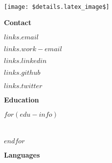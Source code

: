 \documentclass{article}
\begin{document}
    \begin{multicols}{2}
        \begin{tcolorbox}[width=75mm,height fill]
        \begin{center}
            \normalfont
            \pagecolor{maincontent}
            \vspace{12mm}
            {\huge {}}
            \vspace{10mm}\\
            \texttt{[image: \$details.latex\_image\$]} \\
        \end{center}
            \vspace{10mm}
            {\Large {\color{header}\textbf{Contact}}}
            
            \vspace{3mm}
            \textcolor{secondary}{$links.email$}
            \vspace{2mm}
            
            \textcolor{secondary}{$links.work-email$}
            \vspace{2mm}

            \textcolor{secondary}{\href{https://www.linkedin.com/in/$links.linkedin$}{$links.linkedin$}}
            \vspace{2mm}

            \textcolor{secondary}{\href{https://github.com/$links.github$}{$links.github$}}
            \vspace{2mm}

            \textcolor{secondary}{\href{$links.twitter_link$}{$links.twitter$}}
            \vspace{2mm}

            \vspace{7mm}
            {\Large {\color{header}\textbf{Education}}}

            \vspace{3mm}
            $for(edu-info)$
                \\
                \color{secondary}{$edu-info.university$}\\
                \color{secondary}{$edu-info.years$}\\
                \vspace{5mm}
            $endfor$

            \vspace{5mm}
            {\Large {\color{header}\textbf{Languages}}}


\end{tcolorbox}
\end{multicols}
\end{document}
